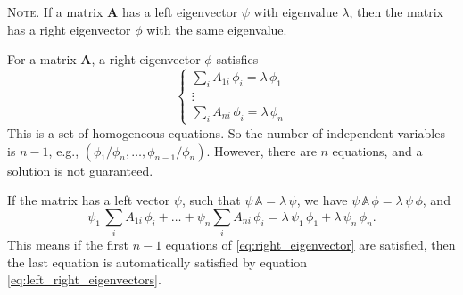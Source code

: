 \documentclass{book}
\numberwithin{equation}{section}
\theoremstyle{plain}
\theoremstyle{definition}
\theoremstyle{remark}
\theoremstyle{BoldStyle}
\numberwithin{exercise}{section}
\newcommand{\note}[1]{{\color{DarkGreen}\footnotesize \textsc{Note.} #1}}
\begin{document}
\note{
  If a matrix $\mathbf A$ has a left eigenvector $\psi$
  with eigenvalue $\lambda$,
  then the matrix has a right eigenvector $\phi$
  with the same eigenvalue.

  For a matrix $\mathbf A$, a right eigenvector $\phi$ satisfies
  \begin{equation}
  \left\{
    \begin{array}{ccc}
    \sum_i A_{1i} \, \phi_i = \lambda \, \phi_1 \\
    \vdots  \\
    \sum_i A_{ni} \, \phi_i = \lambda \, \phi_n
  \end{array}
  \right.
  \tag{a}
  \label{eq:right_eigenvector}
  \end{equation}
  This is a set of homogeneous equations.
  So the number of independent variables is $n - 1$,
  e.g., $\left(\phi_1/\phi_n, \dots, \phi_{n-1}/\phi_n\right)$.
  However, there are $n$ equations,
  and a solution is not guaranteed.

  If the matrix has a left vector $\psi$, such that
  $\psi \, \mathbb A = \lambda \, \psi$,
  we have
  $\psi \, \mathbb A \, \phi = \lambda \, \psi \, \phi$,
  and
  \begin{equation}
    \psi_1 \, \sum_i A_{1i} \, \phi_i
    + \dots +
    \psi_n \sum_i A_{ni} \, \phi_i
    = \lambda \, \psi_1 \, \phi_1
    + \lambda \, \psi_n \, \phi_n.
  \tag{b}
  \label{eq:left_right_eigenvectors}
  \end{equation}
  This means if the first $n-1$ equations of \eqref{eq:right_eigenvector}
  are satisfied, then the last equation is automatically satisfied
  by equation \eqref{eq:left_right_eigenvectors}.
}
\end{document}
